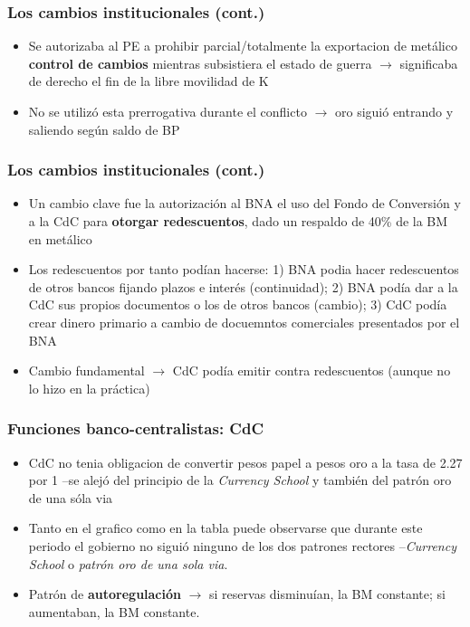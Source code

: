 \documentclass[14pt,aspectratio=169]{beamer}
\begin{document}
  \begin{frame}\frametitle{Los cambios institucionales (cont.)}
    \begin{itemize}\itemsep 10pt
      \item Se autorizaba al PE a prohibir parcial/totalmente la
        exportacion de metálico  \textbf{control de cambios}
        mientras subsistiera el estado de guerra $\longrightarrow$
        significaba de derecho el fin de la libre movilidad de K
        \item No se utilizó esta prerrogativa durante el conflicto
          $\longrightarrow$ oro siguió entrando y saliendo según saldo
          de BP
                 \end{itemize}
      \end{frame}


       \begin{frame}\frametitle{Los cambios institucionales (cont.)}
    \begin{itemize}\itemsep 10pt
      \item Un cambio clave fue la autorización al BNA
el uso del Fondo de Conversión y a la CdC para
\textbf{otorgar redescuentos}, dado un respaldo de 40\% de la BM en metálico
\item Los redescuentos por tanto podían hacerse: 1) BNA podia hacer
  redescuentos de otros bancos fijando plazos e interés (continuidad);
  2) BNA podía dar a la CdC sus propios documentos o los de otros
  bancos (cambio); 3) CdC podía crear dinero primario a cambio de
  docuemntos comerciales presentados por el BNA
  \item Cambio fundamental $\longrightarrow$ CdC podía emitir contra
    redescuentos (aunque no lo hizo en la práctica)
                 \end{itemize}
      \end{frame}

      

  \begin{frame}\frametitle{Funciones banco-centralistas: CdC}
    \begin{itemize}\itemsep 10pt
      \item CdC no tenia obligacion de convertir pesos papel a pesos
        oro a la tasa de 2.27 por 1 --se alejó del principio de la
        \textit{Currency School} y también del patrón oro de una sóla
        via
        \item Tanto en el grafico como en la tabla puede observarse
          que durante este periodo el gobierno no siguió ninguno de
          los dos patrones rectores --\textit{Currency School} o
          \textit{patrón oro de una sola via}.
          \item Patrón de \textbf{autoregulación} $\longrightarrow$ si
            reservas disminuían, la BM constante; si aumentaban, la BM
            constante. 
                 \end{itemize}
      \end{frame}
\end{document}
